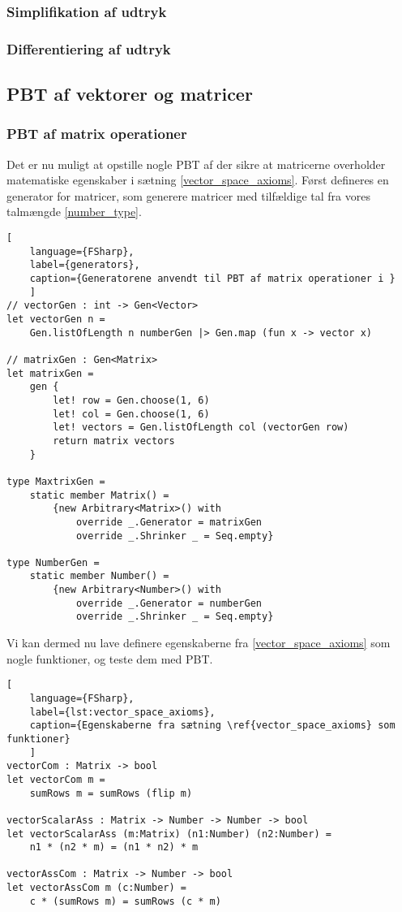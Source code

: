 \subsubsection{Simplifikation af udtryk}\label{sec:PBT_simplification}
\subsubsection{Differentiering af udtryk}\label{sec:PBT_differentiation}
\subsection{PBT af vektorer og matricer}

\subsubsection{PBT af matrix operationer}
Det er nu muligt at opstille nogle PBT af der sikre at matricerne overholder matematiske egenskaber i sætning \ref{vector_space_axioms}. Først defineres en generator for matricer, som generere matricer med tilfældige tal fra vores talmængde \ref{number_type}.

\begin{lstlisting}[
    language={FSharp}, 
    label={generators}, 
    caption={Generatorene anvendt til PBT af matrix operationer i }
    ]
// vectorGen : int -> Gen<Vector>
let vectorGen n =
    Gen.listOfLength n numberGen |> Gen.map (fun x -> vector x)

// matrixGen : Gen<Matrix>
let matrixGen =
    gen {
        let! row = Gen.choose(1, 6)
        let! col = Gen.choose(1, 6)
        let! vectors = Gen.listOfLength col (vectorGen row)
        return matrix vectors
    }

type MaxtrixGen =
    static member Matrix() =
        {new Arbitrary<Matrix>() with
            override _.Generator = matrixGen
            override _.Shrinker _ = Seq.empty}

type NumberGen =
    static member Number() =
        {new Arbitrary<Number>() with
            override _.Generator = numberGen
            override _.Shrinker _ = Seq.empty}   
\end{lstlisting}


Vi kan dermed nu lave definere egenskaberne fra \ref{vector_space_axioms} som nogle funktioner, og teste dem med PBT.

\begin{lstlisting}[
    language={FSharp}, 
    label={lst:vector_space_axioms}, 
    caption={Egenskaberne fra sætning \ref{vector_space_axioms} som funktioner}
    ]
vectorCom : Matrix -> bool
let vectorCom m =
    sumRows m = sumRows (flip m)

vectorScalarAss : Matrix -> Number -> Number -> bool
let vectorScalarAss (m:Matrix) (n1:Number) (n2:Number) =
    n1 * (n2 * m) = (n1 * n2) * m

vectorAssCom : Matrix -> Number -> bool
let vectorAssCom m (c:Number) =
    c * (sumRows m) = sumRows (c * m)
\end{lstlisting}

